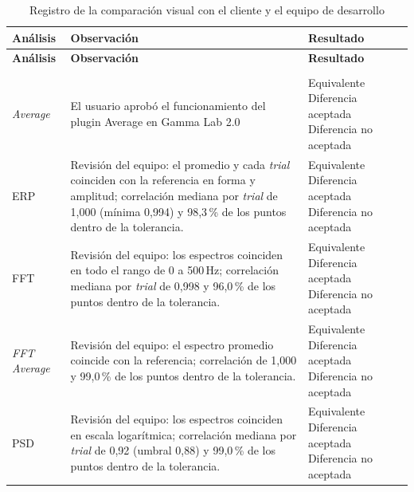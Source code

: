 \documentclass[12pt,letterpaper,oneside]{article}
\DeclareRobustCommand{\_}{\textunderscore\allowbreak}
\newcommand{\casilla}[1]{%
    \fbox{\makebox[1em][c]{#1}}%
}
\begin{document}
\begin{center}
\small
\begin{longtable}{|>{\raggedright\arraybackslash}p{}|>{\raggedright\arraybackslash}p{}|>{\raggedright\arraybackslash}p{}|}
\hline
\textbf{Análisis} & \textbf{Observación} & \textbf{Resultado} \\
\hline
\endfirsthead
\hline
\textbf{Análisis} & \textbf{Observación} & \textbf{Resultado} \\
\hline
\endhead
\hline
\endfoot
\hline
\caption{Registro de la comparación visual con el cliente y el equipo de desarrollo} \label{tab:td_visual} \\
\endlastfoot
\textit{Average} & El usuario aprobó el funcionamiento del plugin Average en Gamma Lab 2.0 & \casilla{x} Equivalente \newline \casilla{} Diferencia aceptada \newline \casilla{} Diferencia no aceptada \\
\hline
ERP & Revisión del equipo: el promedio y cada \textit{trial} coinciden con la referencia en forma y amplitud; correlación mediana por \textit{trial} de 1,000 (mínima 0,994) y 98,3\,\% de los puntos dentro de la tolerancia. & \casilla{x} Equivalente \newline \casilla{} Diferencia aceptada \newline \casilla{} Diferencia no aceptada \\
\hline
FFT & Revisión del equipo: los espectros coinciden en todo el rango de 0 a 500\,Hz; correlación mediana por \textit{trial} de 0,998 y 96,0\,\% de los puntos dentro de la tolerancia. & \casilla{x} Equivalente \newline \casilla{} Diferencia aceptada \newline \casilla{} Diferencia no aceptada \\
\hline
\textit{FFT Average} & Revisión del equipo: el espectro promedio coincide con la referencia; correlación de 1,000 y 99,0\,\% de los puntos dentro de la tolerancia. & \casilla{x} Equivalente \newline \casilla{} Diferencia aceptada \newline \casilla{} Diferencia no aceptada \\
\hline
PSD & Revisión del equipo: los espectros coinciden en escala logarítmica; correlación mediana por \textit{trial} de 0,92 (umbral 0,88) y 99,0\,\% de los puntos dentro de la tolerancia. & \casilla{x} Equivalente \newline \casilla{} Diferencia aceptada \newline \casilla{} Diferencia no aceptada \\

\end{longtable}
\end{center}
\end{document}

